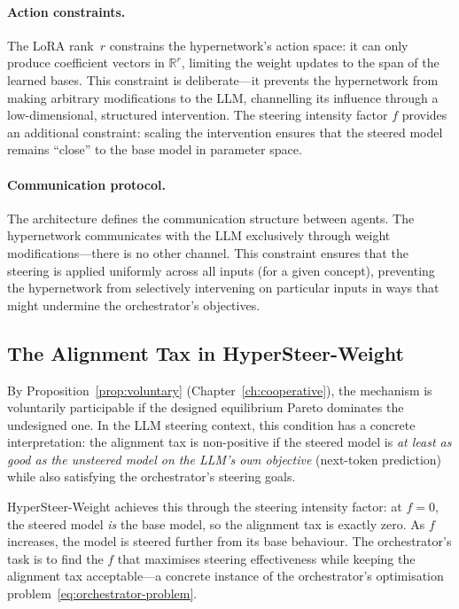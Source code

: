 \paragraph{Action constraints.} The LoRA rank~$r$ constrains the hypernetwork's action space: it can only produce coefficient vectors in $\mathbb{R}^r$, limiting the weight updates to the span of the learned bases. This constraint is deliberate---it prevents the hypernetwork from making arbitrary modifications to the LLM, channelling its influence through a low-dimensional, structured intervention. The steering intensity factor $f$ provides an additional constraint: scaling the intervention ensures that the steered model remains ``close'' to the base model in parameter space.

\paragraph{Communication protocol.} The architecture defines the communication structure between agents. The hypernetwork communicates with the LLM exclusively through weight modifications---there is no other channel. This constraint ensures that the steering is applied uniformly across all inputs (for a given concept), preventing the hypernetwork from selectively intervening on particular inputs in ways that might undermine the orchestrator's objectives.

\subsection{The Alignment Tax in HyperSteer-Weight}
\label{subsec:alignment-tax-hsw}

By Proposition~\ref{prop:voluntary} (Chapter~\ref{ch:cooperative}), the mechanism is voluntarily participable if the designed equilibrium Pareto dominates the undesigned one. In the LLM steering context, this condition has a concrete interpretation: the alignment tax is non-positive if the steered model is \emph{at least as good as the unsteered model on the LLM's own objective} (next-token prediction) while also satisfying the orchestrator's steering goals.

HyperSteer-Weight achieves this through the steering intensity factor: at $f=0$, the steered model \emph{is} the base model, so the alignment tax is exactly zero. As $f$ increases, the model is steered further from its base behaviour. The orchestrator's task is to find the $f$ that maximises steering effectiveness while keeping the alignment tax acceptable---a concrete instance of the orchestrator's optimisation problem~\eqref{eq:orchestrator-problem}.

